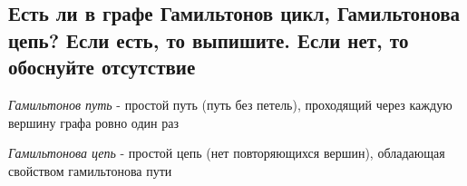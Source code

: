 \documentclass{article}
\begin{document}
        \subsection{Есть ли в графе Гамильтонов цикл, Гамильтонова цепь? Если есть, то выпишите. Если нет, то обоснуйте отсутствие}
            \textit{Гамильтонов путь} - простой путь (путь без петель), проходящий через каждую вершину графа ровно один раз
            \begin{figure}[h!]
            \end{figure}
            \newpage
            \textit{Гамильтонова цепь} - простой цепь (нет повторяющихся вершин), обладающая свойством гамильтонова пути
\end{document}
